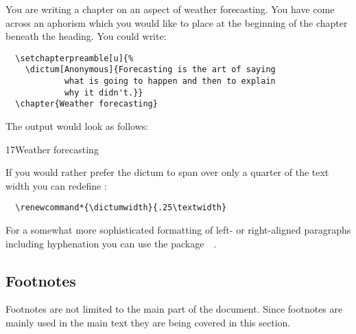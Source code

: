 \begin{Example}
  You are writing a chapter on an aspect of weather forecasting. You
  have come across an aphorism which you would like to place at the
  beginning of the chapter beneath the heading. You could write:
\begin{lstlisting}
  \setchapterpreamble[u]{%
    \dictum[Anonymous]{Forecasting is the art of saying
            what is going to happen and then to explain
            why it didn't.}}
  \chapter{Weather forecasting}
\end{lstlisting}
  The output would look as follows:
  \begin{ShowOutput}
    {%
      17\enskip Weather forecasting\par} \vspace{\baselineskip}
  \end{ShowOutput}

  If you would rather prefer the dictum to span over only a quarter of
  the text width you can redefine :
\begin{lstlisting}
  \renewcommand*{\dictumwidth}{.25\textwidth}
\end{lstlisting}
\end{Example}

For a somewhat more sophisticated formatting of left- or right-aligned
paragraphs including hyphenation you can use the
package~~\cite{package:ragged2e}.
%
%
%
%
%
%


\subsection{Footnotes}
\label{sec:maincls.footnotes}

Footnotes are not limited to the main part of the document. Since
footnotes are mainly used in the main text they are
being covered in this section.

